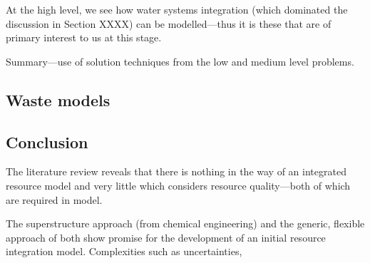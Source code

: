  At the high level, we see how water systems integration (which dominated the discussion in Section XXXX) can be modelled---thus it is these that are of primary interest to us at this stage.

Summary---use of solution techniques from the low and medium level problems.

\subsection{Waste models}

\subsection{Conclusion}
The literature review reveals that there is nothing in the way of an integrated resource model and very little which considers resource quality---both of which are required in model.

The superstructure approach (from chemical engineering) and the generic, flexible approach of \citet{Samsatli} both show promise for the development of an initial resource integration model. Complexities such as uncertainties, 

